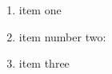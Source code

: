 \documentclass{article}
\begin{document}
\begin{enumerate}
\item item one
\item item number two:
\item item three
\end{enumerate}
\end{document}
